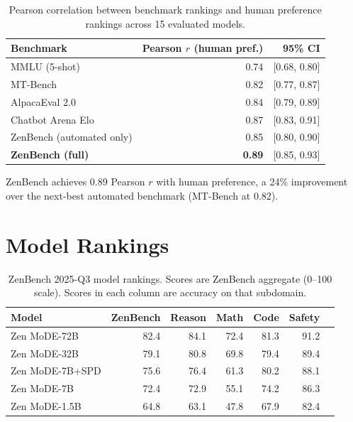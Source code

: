 \documentclass[11pt,a4paper]{article}
\begin{document}
\begin{table}[H]
\centering
\caption{Pearson correlation between benchmark rankings and human preference rankings
across 15 evaluated models.}
\begin{tabular}{lrr}
\toprule
\textbf{Benchmark} & \textbf{Pearson $r$ (human pref.)} & \textbf{95\% CI} \\
\midrule
MMLU (5-shot)                   & 0.74 & [0.68, 0.80] \\
MT-Bench                        & 0.82 & [0.77, 0.87] \\
AlpacaEval 2.0                  & 0.84 & [0.79, 0.89] \\
Chatbot Arena Elo               & 0.87 & [0.83, 0.91] \\
ZenBench (automated only)       & 0.85 & [0.80, 0.90] \\
\textbf{ZenBench (full)}        & \textbf{0.89} & [0.85, 0.93] \\
\bottomrule
\end{tabular}
\label{tab:human_corr}
\end{table}

ZenBench achieves 0.89 Pearson $r$ with human preference, a 24\% improvement over
the next-best automated benchmark (MT-Bench at 0.82).

\section{Model Rankings}
\label{sec:rankings}

\begin{table}[H]
\centering
\caption{ZenBench 2025-Q3 model rankings. Scores are ZenBench aggregate (0--100 scale).
Scores in each column are accuracy on that subdomain.}
\begin{tabular}{lrrrrrr}
\toprule
\textbf{Model} & \textbf{ZenBench} & \textbf{Reason} & \textbf{Math} & \textbf{Code} & \textbf{Safety} \\
\midrule
Zen MoDE-72B     & 82.4 & 84.1 & 72.4 & 81.3 & 91.2 \\
Zen MoDE-32B     & 79.1 & 80.8 & 69.8 & 79.4 & 89.4 \\
Zen MoDE-7B+SPD  & 75.6 & 76.4 & 61.3 & 80.2 & 88.1 \\
Zen MoDE-7B      & 72.4 & 72.9 & 55.1 & 74.2 & 86.3 \\
Zen MoDE-1.5B    & 64.8 & 63.1 & 47.8 & 67.9 & 82.4 \\
\bottomrule
\end{tabular}
\label{tab:rankings}
\end{table}
\end{document}
